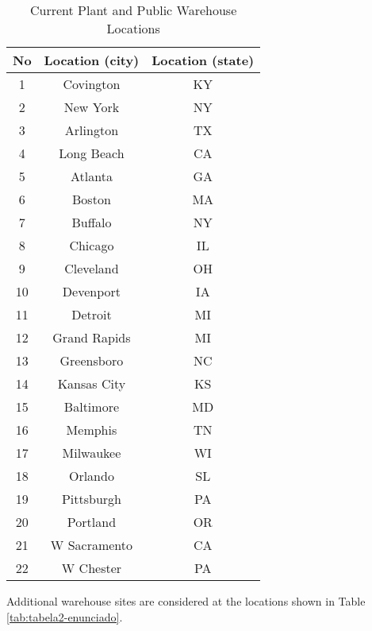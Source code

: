 \documentclass[12pt,a4paper]{article}
\begin{document}
\begin{table}[!h]
    \caption{Current Plant and Public Warehouse Locations}
    \centering
    \label{tab:tabela1-enunciado}
    \begin{tabular}{|c|c|c|}
    \hline
    No & Location (city) & Location (state) \\
    \hline
    1  & Covington       & KY               \\
    2  & New York        & NY               \\
    3  & Arlington       & TX               \\
    4  & Long Beach      & CA               \\
    5  & Atlanta         & GA               \\
    6  & Boston          & MA               \\
    7  & Buffalo         & NY               \\
    8  & Chicago         & IL               \\
    9  & Cleveland       & OH               \\
    10 & Devenport       & IA               \\
    11 & Detroit         & MI               \\
    12 & Grand Rapids    & MI               \\
    13 & Greensboro      & NC               \\
    14 & Kansas City     & KS               \\
    15 & Baltimore       & MD               \\
    16 & Memphis         & TN               \\
    17 & Milwaukee       & WI               \\
    18 & Orlando         & SL               \\
    19 & Pittsburgh      & PA               \\
    20 & Portland        & OR               \\
    21 & W Sacramento    & CA               \\
    22 & W Chester       & PA               \\
    \hline
\end{tabular}
\end{table}



Additional warehouse sites are considered at the locations shown in Table \ref{tab:tabela2-enunciado}.
\end{document}
